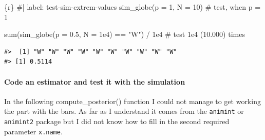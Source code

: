 \documentclass[
  letterpaper,
  DIV=11,
  numbers=noendperiod]{scrreprt}
\let\oldparagraph\paragraph
\renewcommand{\paragraph}[1]{\oldparagraph{#1}\mbox{}}
\newenvironment{Shaded}{\begin{snugshade}}{\end{snugshade}}
\newcommand{\AttributeTok}[1]{\textcolor[rgb]{0.40,0.45,0.13}{#1}}
\newcommand{\CommentTok}[1]{\textcolor[rgb]{0.37,0.37,0.37}{#1}}
\newcommand{\DecValTok}[1]{\textcolor[rgb]{0.68,0.00,0.00}{#1}}
\newcommand{\FloatTok}[1]{\textcolor[rgb]{0.68,0.00,0.00}{#1}}
\newcommand{\FunctionTok}[1]{\textcolor[rgb]{0.28,0.35,0.67}{#1}}
\newcommand{\InformationTok}[1]{\textcolor[rgb]{0.37,0.37,0.37}{#1}}
\newcommand{\NormalTok}[1]{\textcolor[rgb]{0.00,0.23,0.31}{#1}}
\newcommand{\SpecialCharTok}[1]{\textcolor[rgb]{0.37,0.37,0.37}{#1}}
\newcommand{\StringTok}[1]{\textcolor[rgb]{0.13,0.47,0.30}{#1}}
\begin{document}
\begin{Shaded}
\begin{Highlighting}[]
\InformationTok{\textasciigrave{}\textasciigrave{}\textasciigrave{}\{r\}}
\CommentTok{\#| label: test{-}sim{-}extrem{-}values}
\FunctionTok{sim\_globe}\NormalTok{(}\AttributeTok{p =} \DecValTok{1}\NormalTok{, }\AttributeTok{N =} \DecValTok{10}\NormalTok{) }\CommentTok{\# test, when p = 1}

\FunctionTok{sum}\NormalTok{(}\FunctionTok{sim\_globe}\NormalTok{(}\AttributeTok{p =} \FloatTok{0.5}\NormalTok{, }\AttributeTok{N =} \FloatTok{1e4}\NormalTok{) }\SpecialCharTok{==} \StringTok{"W"}\NormalTok{) }\SpecialCharTok{/} \FloatTok{1e4} \CommentTok{\# test 1e4 (10.000) times}
\InformationTok{\textasciigrave{}\textasciigrave{}\textasciigrave{}}
\end{Highlighting}
\end{Shaded}

\begin{verbatim}
#>  [1] "W" "W" "W" "W" "W" "W" "W" "W" "W" "W"
#> [1] 0.5114
\end{verbatim}

\hypertarget{code-an-estimator-and-test-it-with-the-simulation}{%
\paragraph{Code an estimator and test it with the
simulation}\label{code-an-estimator-and-test-it-with-the-simulation}}

In the following compute\_posterior() function I could not manage to get
working the part with the bars. As far as I understand it comes from the
\texttt{animint} or \texttt{animint2} package but I did not know how to
fill in the second required parameter \texttt{x.name}.
\end{document}
